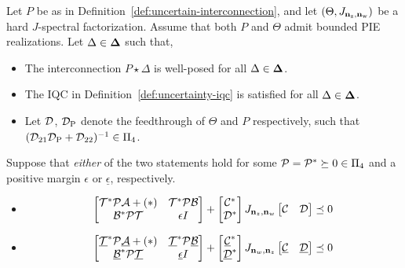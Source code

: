 \begin{corollary}\label{thm:dual-KYP}
   Let $P$ be as in Definition~\ref{def:uncertain-interconnection}, and let
$(\Theta,J_{\mathbf{n}_{{\mathrm{z}}},\mathbf{n}_{{\mathrm{w}}}})$ be a hard
$J$-spectral factorization. Assume that both $P$ and $\Theta$ admit
bounded PIE realizations. Let $\Delta \in \mathbf{\Delta}$ such that,
    \begin{itemize}
        \item The interconnection $P\star\Delta$ is well-posed for all
        $\Delta\in\mathbf{\Delta}$.
        \item The IQC in Definition~\ref{def:uncertainty-iqc} is satisfied for all $\Delta\in\mathbf{\Delta}$.
        \item Let $\mathcal{D}$, $\mathcal{D}_{\mathrm{P}}$ denote the feedthrough of $\Theta$ and $P$ respectively, such that $(\mathcal{D}_{21}\mathcal{D}_{\mathrm{P}} + \mathcal{D}_{22})^{-1}\in\Pi_4$.
    \end{itemize}
    Suppose that \emph{either} of the two statements hold for some $\mathcal{P} = \mathcal{P}^* \succeq 0 \in \Pi_4$
    and a positive margin $\epsilon$ or $\underline\epsilon$, respectively.
    \begin{itemize}
        \item \begin{minipage}[c]{\linewidth}
        \begin{equation*}
            \begin{bmatrix}\mathcal{T}^*\mathcal{P}\mathcal{A} + (*) & \mathcal{T}^*\mathcal{P}\mathcal{B}\\
            \mathcal{B}^*\mathcal{P}\mathcal{T} & \epsilon I\end{bmatrix} + \begin{bmatrix}\mathcal{C}^* \\ \mathcal{D}^*\end{bmatrix}J_{\mathbf{n}_z, \mathbf{n}_w}\begin{bmatrix}\mathcal{C} & \mathcal{D}\end{bmatrix} \preceq 0
        \end{equation*}
        \end{minipage}
        \item \begin{minipage}[c]{\linewidth}
        \begin{equation}\label{eq:dual-kyp}
            \begin{bmatrix}\underline{\mathcal{T}}^*\mathcal{P}\underline{\mathcal{A}} + (*)& \underline{\mathcal{T}}^*\mathcal{P}\underline{\mathcal{B}}\\
            \underline{\mathcal{B}}^*\mathcal{P}\underline{\mathcal{T}} & \underline{\epsilon} I\end{bmatrix} + \begin{bmatrix}\underline{\mathcal{C}}^* \\ \underline{\mathcal{D}}^*\end{bmatrix}J_{\mathbf{n}_w, \mathbf{n}_z}\begin{bmatrix}\underline{\mathcal{C}} & \underline{\mathcal{D}}\end{bmatrix} \preceq 0
        \end{equation}
        \end{minipage}
    \end{itemize}

\end{corollary}
